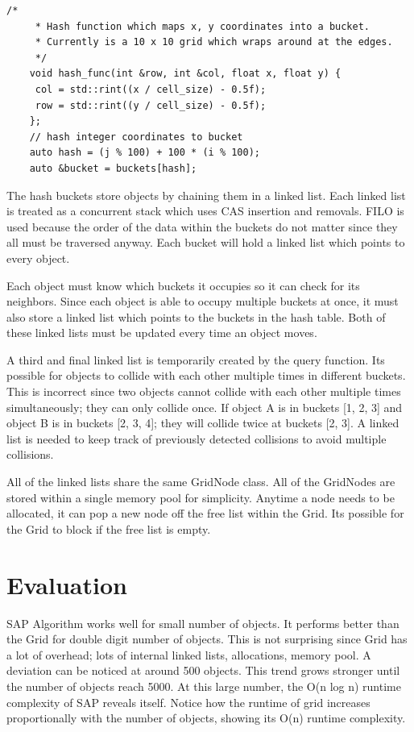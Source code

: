 \documentclass[conference]{IEEEtran}
\begin{document}
\begin{lstlisting}	
/*
     * Hash function which maps x, y coordinates into a bucket.
     * Currently is a 10 x 10 grid which wraps around at the edges.
     */
    void hash_func(int &row, int &col, float x, float y) {
   	 col = std::rint((x / cell_size) - 0.5f);
   	 row = std::rint((y / cell_size) - 0.5f);
    };
    // hash integer coordinates to bucket
    auto hash = (j % 100) + 100 * (i % 100);
    auto &bucket = buckets[hash];
\end{lstlisting}

The hash buckets store objects by chaining them in a linked list. Each linked list is treated as a concurrent stack which uses CAS insertion and removals. FILO is used because the order of the data within the buckets do not matter since they all must be traversed anyway. Each bucket will hold a linked list which points to every object.

Each object must know which buckets it occupies so it can check for its neighbors. Since each object is able to occupy multiple buckets at once, it must also store a linked list which points to the buckets in the hash table. Both of these linked lists must be updated every time an object moves.

A third and final linked list is temporarily created by the query function. It\textquotesingle s possible for objects to collide with each other multiple times in different buckets. This is incorrect since two objects cannot collide with each other multiple times simultaneously; they can only collide once. If object A is in buckets [1, 2, 3] and object B is in buckets [2, 3, 4]; they will collide twice at buckets [2, 3]. A linked list is needed to keep track of previously detected collisions to avoid multiple collisions.

All of the linked lists share the same GridNode class. All of the GridNodes are stored within a single memory pool for simplicity. Anytime a node needs to be allocated, it can pop a new node off the free list within the Grid. It\textquotesingle s possible for the Grid to block if the free list is empty.

\section{Evaluation}
SAP Algorithm works well for small number of objects. It performs better than the Grid for double digit number of objects. This is not surprising since Grid has a lot of overhead; lots of internal linked lists, allocations, memory pool. A deviation can be noticed at around 500 objects. This trend grows stronger until the number of objects reach 5000. At this large number, the O(n log n) runtime complexity of SAP reveals itself. Notice how the runtime of grid increases proportionally with the number of objects, showing it\textquotesingle s O(n) runtime complexity.
\end{document}

